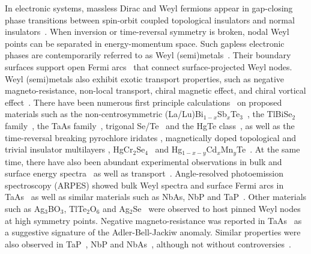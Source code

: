 In electronic systems, massless Dirac and Weyl fermions appear in gap-closing phase transitions between spin-orbit coupled topological insulators and normal insulators~\cite{Murakami2007}. When inversion or time-reversal symmetry is broken, nodal Weyl points can be separated in energy-momentum space. Such gapless electronic phases are contemporarily referred to as Weyl (semi)metals~\cite{WanVishwanathSavrasovPRB11,YangLuRan11,burkovBalenstPRL11,BurkovBalentsPRB11}. Their boundary surfaces support open Fermi arcs~\cite{WanVishwanathSavrasovPRB11} that connect surface-projected Weyl nodes. Weyl (semi)metals also exhibit exotic transport properties, such as negative magneto-resistance, non-local transport, chiral magnetic effect, and chiral vortical effect~\cite{Burkov_Weyl_electromagnetic_2012,Hosur_Weyl_develop,Lu_anomaly_Weyl_2013,SonSpivak13,Sid_anomaly_Weyl,Marcel_Weyl_response}. There have been numerous first principle calculations~\cite{WengXiZhong16} on proposed materials such as the non-centrosymmetric (La/Lu)Bi$_{1-x}$Sb$_x$Te$_3$~\cite{LiuVanderbilt14}, the TlBiSe$_2$ family~\cite{SinghSharmaLinHasanPrasadBansil12}, the TaAs family~\cite{WengBernevigDai2015,HuangXuZahidTaAs2015}, trigonal Se/Te~\cite{HirayamaOkugawaIshibashiMurakamiMiyake15} and the HgTe class~\cite{RuanXing16}, as well as the time-reversal breaking pyrochlore iridates \cite{WanVishwanathSavrasovPRB11,witczak_kim_weyl_2012,chen_hermele_weyl}, magnetically doped topological and trivial insulator multilayers \cite{burkovBalenstPRL11}, HgCr$_2$Se$_4$~\cite{XuWengWangDaiFang11} and Hg$_{1-x-y}$Cd$_x$Mn$_y$Te~\cite{BulmashLiuQi14}. At the same time, there have also been abundant experimental observations in bulk and surface energy spectra~\cite{HasanXuBelopolskiHuang17} as well as transport~\cite{WangLinWangYuLiao17}. Angle-resolved photoemission spectroscopy (\hypertarget{ARPES}{ARPES}) showed bulk Weyl spectra and surface Fermi arcs in TaAs~\cite{Xu_Weyl_2015_first,Weyl_discovery_TaAs,YangLiuChenTaAs2015,TaAs_Weyl_obeservationDing,BelopolskiZahid16} as well as similar materials such as NbAs, NbP and TaP~\cite{XuNbAs15,LiuChen16}. Other materials such as Ag$_3$BO$_3$, TlTe$_2$O$_6$ and Ag$_2$Se~\cite{ChangHasan16} were observed to host pinned Weyl nodes at high symmetry points. %
Negative magneto-resistance was reported in TaAs~\cite{Huang_Weyl_2015,Zhang_anomaly_Weyl_2015} as a suggestive signature of the Adler-Bell-Jackiw anomaly. Similar properties were also observed in TaP~\cite{HuMaoTaP17}, NbP and NbAs~\cite{CorinnaNiemannFelserNbP17,LiXuNbAsNbP17,GoothNielschNbP17}, although not without controversies~\cite{SudeshPatnaikNbP17}. 

